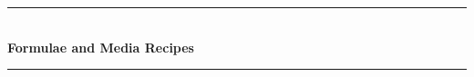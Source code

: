 \documentclass[idxtotoc,hyperref,openany]{labbook} %
\newcommand{\HRule}{\rule{\linewidth}{0.5mm}} %
\begin{document}
%
% 
% 
% 
% 
% 
% 
% 
% 
% 
% 
% 


\labday{} %

\begin{center}
\HRule \\[0.4cm]
{\huge \textbf{Formulae and Media Recipes}}\\[0.4cm] %
\HRule \\[1.5cm]
\end{center}

\end{document}
